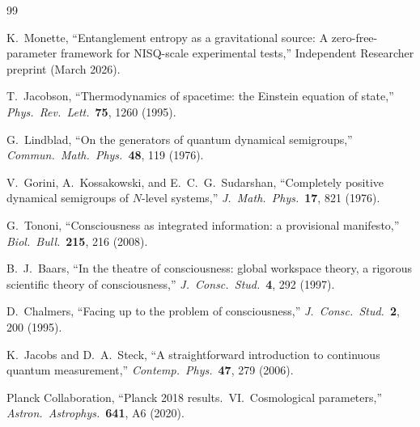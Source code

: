 \documentclass[12pt,letterpaper]{article}
\theoremstyle{definition}
\theoremstyle{remark}
\begin{document}
\begin{thebibliography}{99}

K.~Monette,
``Entanglement entropy as a gravitational source: A zero-free-parameter framework
for NISQ-scale experimental tests,''
Independent Researcher preprint (March 2026).

T.~Jacobson,
``Thermodynamics of spacetime: the Einstein equation of state,''
\textit{Phys.\ Rev.\ Lett.}\ \textbf{75}, 1260 (1995).

G.~Lindblad,
``On the generators of quantum dynamical semigroups,''
\textit{Commun.\ Math.\ Phys.}\ \textbf{48}, 119 (1976).

V.~Gorini, A.~Kossakowski, and E.~C.~G.~Sudarshan,
``Completely positive dynamical semigroups of $N$-level systems,''
\textit{J.\ Math.\ Phys.}\ \textbf{17}, 821 (1976).

G.~Tononi,
``Consciousness as integrated information: a provisional manifesto,''
\textit{Biol.\ Bull.}\ \textbf{215}, 216 (2008).

B.~J.~Baars,
``In the theatre of consciousness: global workspace theory, a rigorous scientific
theory of consciousness,''
\textit{J.\ Consc.\ Stud.}\ \textbf{4}, 292 (1997).

D.~Chalmers,
``Facing up to the problem of consciousness,''
\textit{J.\ Consc.\ Stud.}\ \textbf{2}, 200 (1995).

K.~Jacobs and D.~A.~Steck,
``A straightforward introduction to continuous quantum measurement,''
\textit{Contemp.\ Phys.}\ \textbf{47}, 279 (2006).

Planck Collaboration,
``Planck 2018 results.\ VI.\ Cosmological parameters,''
\textit{Astron.\ Astrophys.}\ \textbf{641}, A6 (2020).

\end{thebibliography}
\end{document}
